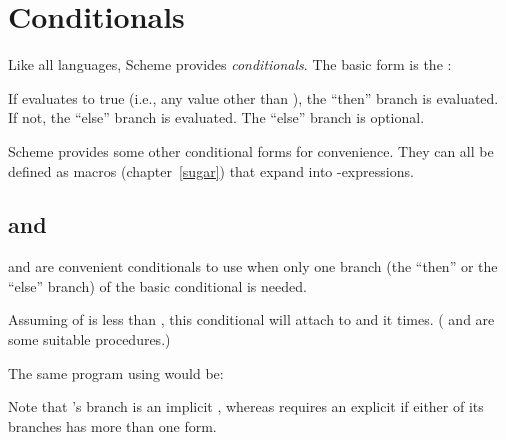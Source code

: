 \chapter{Conditionals}

Like all languages, Scheme provides {\em
conditionals}.  The basic form is the :


If  evaluates to true (i.e., any value
other than ), the “then” branch is evaluated.
If not, the “else” branch  is evaluated.  The
“else” branch  is optional.


Scheme provides some other conditional forms for
convenience.  They can all be defined as macros
(chapter~\ref{sugar}) that expand
into -expressions.


\section{ and }

 and  are convenient conditionals
to use when only one branch (the “then” or the
“else” branch) of the basic conditional is needed.


Assuming  of  is less than
, this conditional will attach  to
 and  it  times.  (
and  are some suitable procedures.)

The same program using  would be:



Note that ’s branch is an implicit ,
whereas  requires an explicit  if either
of its branches has more than one form.

